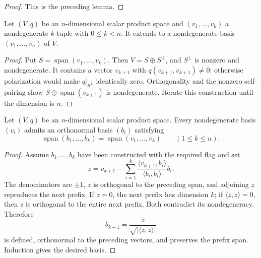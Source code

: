 \begin{proof}
\leanok
\sketch This is the preceding lemma.
\end{proof}

\begin{lemma}\label{lem:completion-nondegenerate-bases}
\leanok
{}
Let $(V,q)$ be an $n$-dimensional scalar product space and
$(v_1,\ldots,v_k)$ a nondegenerate $k$-tuple with $0\leq k<n$. It extends to a
nondegenerate basis $(v_1,\ldots,v_n)$ of $V$.
\end{lemma}

\begin{proof}
\leanok
{}
\sketch Put $S=\operatorname{span}(v_1,\ldots,v_k)$. Then
$V=S\oplus S^\perp$, and $S^\perp$ is nonzero and nondegenerate. It contains a
vector $v_{k+1}$ with $q(v_{k+1},v_{k+1})\ne0$: otherwise polarization would make
$q|_{S^\perp}$ identically zero. Orthogonality and the nonzero self-pairing show
$S\oplus\operatorname{span}(v_{k+1})$ is nondegenerate. Iterate this construction
until the dimension is $n$.
\end{proof}

\begin{proposition}
\label{prop:gram-schmidt-algorithm-scalar-products}
\leanok
{}
Let $(V,q)$ be an $n$-dimensional scalar product space. Every nondegenerate basis
$(v_i)$ admits an orthonormal basis $(b_i)$ satisfying
\[
\operatorname{span}(b_1,\ldots,b_k)
=\operatorname{span}(v_1,\ldots,v_k)
\qquad(1\leq k\leq n).
\]
\end{proposition}

\begin{proof}
\leanok
{}
\sketch Assume $b_1,\ldots,b_k$ have been constructed with the required flag and
set
\[
z=v_{k+1}-\sum_{i=1}^k
\frac{\langle v_{k+1},b_i\rangle}{\langle b_i,b_i\rangle}b_i.
\]
The denominators are $\pm1$, $z$ is orthogonal to the preceding span, and adjoining
$z$ reproduces the next prefix. If $z=0$, the next prefix has dimension $k$; if
$\langle z,z\rangle=0$, then $z$ is orthogonal to the entire next prefix. Both
contradict its nondegeneracy. Therefore
\[
b_{k+1}=\frac{z}{\sqrt{|\langle z,z\rangle|}}
\]
is defined, orthonormal to the preceding vectors, and preserves the prefix span.
Induction gives the desired basis.
\end{proof}

